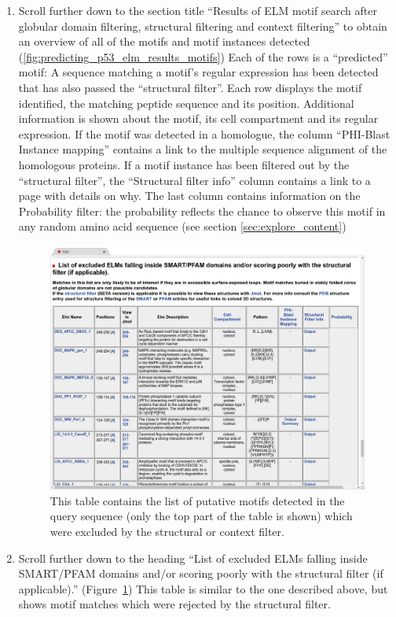 \documentclass[12pt]{article}
\begin{document}
\begin{enumerate}
	\item Scroll further down to the section title ``Results of ELM motif search
		after globular domain filtering, structural filtering and context
		filtering'' to obtain an overview of all of the motifs and motif
		instances detected
		(\ref{fig:predicting_p53_elm_results_motifs})
		Each of the rows is a ``predicted'' motif: A sequence matching a
		motif's regular expression has been detected that has also passed the
		``structural filter''.
		Each row displays the motif identified, the matching peptide
		sequence and its position. Additional information is shown about the
		motif, its cell compartment and its regular expression. If the motif
		was detected in a homologue, the column ``PHI-Blast Instance
		mapping'' contains a link to the multiple sequence alignment of the
		homologous proteins. If a motif instance has been filtered out
		by the ``structural filter'', the ``Structural filter info'' column
		contains a link to a page with details on why.
		The last column contains information on the Probability filter: the
		probability reflects the chance to observe this motif in any random
		amino acid sequence (see section \ref{sec:explore_content})

	\begin{figure}[h!]
	\centering
		\includegraphics[width=\textwidth]{Figures/predicting_p53/elm_results_motifs_filtered.png}
		\caption{
		This table contains the list of putative motifs detected in the query sequence (only
		the top part of the table is shown) which were excluded by the
		structural or context filter.
		}
		\label{fig:predicting_p53_elm_results_motifs_filtered}
	\end{figure}

	\item Scroll further down to the heading ``List of excluded ELMs falling inside
		SMART/PFAM domains and/or scoring poorly with the structural filter (if
		applicable).''
		(Figure~\ref{fig:predicting_p53_elm_results_motifs_filtered})
		This table is similar to the one described above, but shows motif
		matches which were rejected by the structural filter.
	\end{enumerate}
\end{document}
